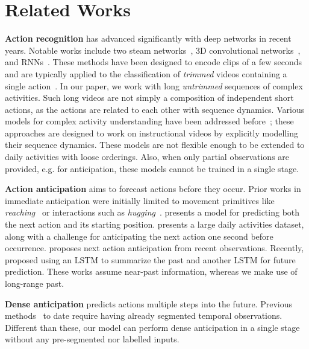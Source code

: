 \documentclass[runningheads]{llncs}
\makeatletter
\newcommand*{\eg}{e.g.\@\xspace}
\makeatother
\begin{document}
\section{Related Works}
\textbf{Action recognition} has advanced significantly with deep networks in recent years. Notable works include two steam networks~\cite{simonyan2014two,wang2016temporal}, 3D convolutional networks~\cite{tran2015learning,carreira2017quo}, and RNNs~\cite{donahue2015long,yue2015beyond}. These methods have been designed to encode clips of a few seconds and are typically applied to the classification of \emph{trimmed} videos containing a single action~\cite{Soomro101,kay2017kinetics}. In our paper, we work with long \emph{untrimmed} sequences of complex activities. Such long videos are not simply a composition of independent short actions, as the actions are related to each other with sequence dynamics. Various models for complex activity understanding have been addressed before~\cite{ding2018weakly,farha2019ms,sener2018unsupervised}; these approaches are designed to work on instructional videos by explicitly modelling their sequence dynamics. These models are not flexible enough to be extended to daily activities with loose orderings. Also, when only partial observations are provided, \eg for anticipation, these models cannot be trained in a single stage. 

\textbf{Action anticipation} aims to forecast actions before they occur.   Prior works in immediate anticipation were initially limited to movement primitives like \emph{reaching}~\cite{Koppula15pami} or interactions such as \emph{hugging}~\cite{vondrick2016anticipating}. \cite{mahmud2017joint} presents a model for predicting both the next action and its starting position. \cite{damen2018scaling} presents a large daily activities dataset, along with a challenge for anticipating the next action one second before occurrence. \cite{miech2019leveraging} proposes next action anticipation from recent observations. Recently, \cite{furnari2019rulstm} proposed using an LSTM to summarize the past and another LSTM for future prediction. These works assume near-past information, whereas we make use of long-range past.

\textbf{Dense anticipation} predicts actions multiple steps into the future. Previous methods~\cite{abu2018will,Ke_2019_CVPR} to date require having already segmented temporal observations. Different than these, our model can perform dense anticipation in a single stage without any pre-segmented nor labelled inputs. 
\end{document}

